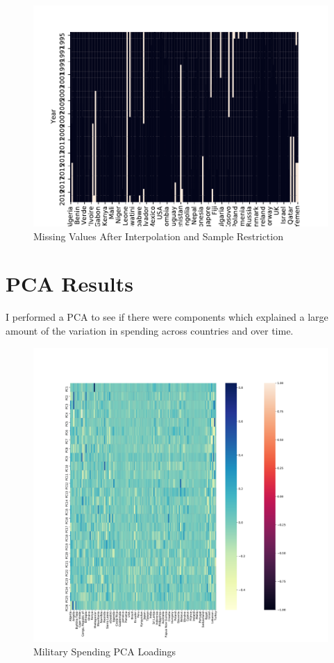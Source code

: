 \documentclass{report}
\begin{document}
	\begin{figure}[h!]
		\centering
		\caption{Missing Values After Interpolation and Sample Restriction}
		\label{SIPRI_Missing_Values_Inter_Post_1995}	
		\includegraphics[width=\linewidth,keepaspectratio=true]{../Output/Figures/SIPRI_Missing_Values_Interpolate_Post_1995.pdf}
	\end{figure}

    \newpage \clearpage

    \section*{PCA Results}

    I performed a PCA to see if there were components which explained a large amount of the variation in spending across countries and over time.

	\begin{figure}[h!]
		\centering
		\caption{Military Spending PCA Loadings}
		\label{Milex_Loadings}	
		\includegraphics[width=\linewidth,keepaspectratio=true]{../Output/Figures/Milex_Loadings.pdf}
	\end{figure}
\end{document}
